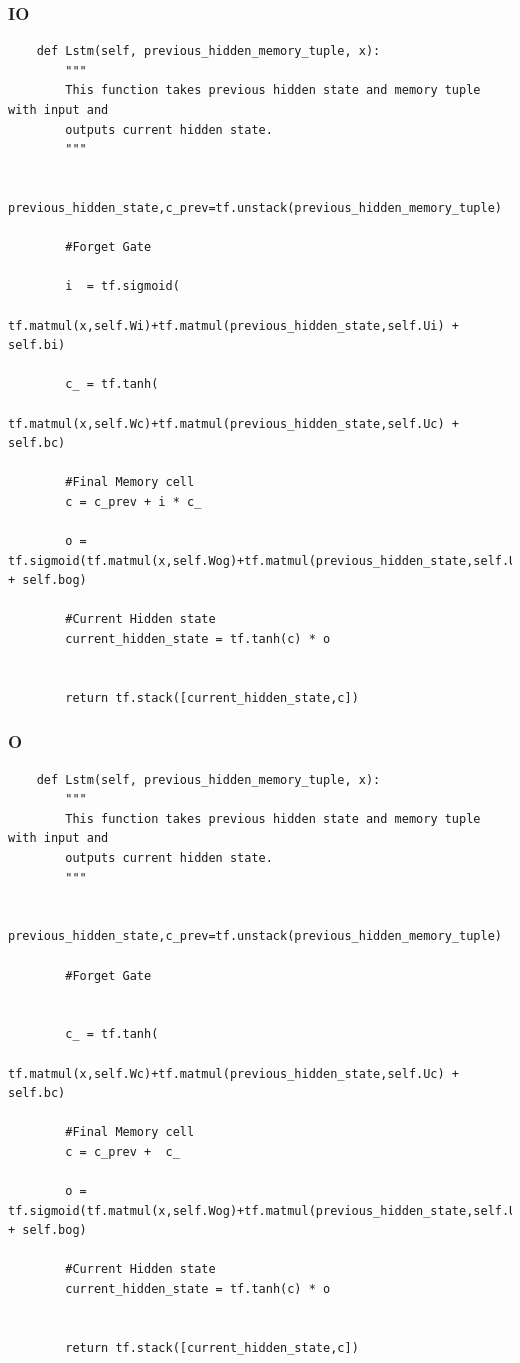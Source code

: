 \documentclass[12pt, letterpaper]{article}
\begin{document}
\subsubsection{IO}
\begin{verbatim}
    def Lstm(self, previous_hidden_memory_tuple, x):
        """
        This function takes previous hidden state and memory tuple with input and
        outputs current hidden state.
        """
        
        previous_hidden_state,c_prev=tf.unstack(previous_hidden_memory_tuple)

        #Forget Gate
        
        i  = tf.sigmoid(
            tf.matmul(x,self.Wi)+tf.matmul(previous_hidden_state,self.Ui) + self.bi)
          
        c_ = tf.tanh(
            tf.matmul(x,self.Wc)+tf.matmul(previous_hidden_state,self.Uc) + self.bc)
        
        #Final Memory cell
        c = c_prev + i * c_
        
        o = tf.sigmoid(tf.matmul(x,self.Wog)+tf.matmul(previous_hidden_state,self.Uog) + self.bog)
            
        #Current Hidden state
        current_hidden_state = tf.tanh(c) * o


        return tf.stack([current_hidden_state,c])

\end{verbatim}
\subsubsection{O}
\begin{verbatim}
    def Lstm(self, previous_hidden_memory_tuple, x):
        """
        This function takes previous hidden state and memory tuple with input and
        outputs current hidden state.
        """
        
        previous_hidden_state,c_prev=tf.unstack(previous_hidden_memory_tuple)

        #Forget Gate
        
          
        c_ = tf.tanh(
            tf.matmul(x,self.Wc)+tf.matmul(previous_hidden_state,self.Uc) + self.bc)
        
        #Final Memory cell
        c = c_prev +  c_
        
        o = tf.sigmoid(tf.matmul(x,self.Wog)+tf.matmul(previous_hidden_state,self.Uog) + self.bog)
            
        #Current Hidden state
        current_hidden_state = tf.tanh(c) * o


        return tf.stack([current_hidden_state,c])
\end{verbatim}
\end{document}
